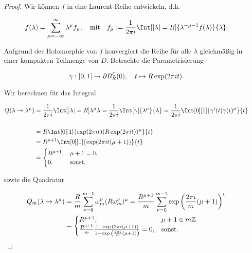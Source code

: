 \begin{proof}

    Wir können $f$ in eine Laurent-Reihe entwickeln, d.h.

    \begin{align*}
        f(\lambda) = \sum_{\mu = - \infty}^\infty \lambda^\mu f_\mu,
        \quad
        \text{mit}
        \quad
        f_\mu := \frac{1}{2\pi i} \Int[|\lambda| = R]{\lambda^{-\mu - 1} f(\lambda)}{\lambda}.
    \end{align*}

    Aufgrund der Holomorphie von $f$ konvergiert die Reihe für alle $\lambda$ gleichmäßig in einer kompakten Teilmenge von $D$.
    Betrachte die Parametrisierung

    \begin{align*}
        \gamma:
        [0,1] \to \partial B_R^{\mathbb{C}}(0), \quad
        t \mapsto R\exp(2\pi i t).
    \end{align*}

    Wir berechnen für das Integral

    \begin{align*}
        Q(\lambda \to \lambda^\mu)
        & =
        \frac{1}{2 \pi i}
        \Int[\abs{\lambda} = R]{\lambda^\mu}{\lambda}
         =
        \frac{1}{2 \pi i}
        \Int[\gamma]{\lambda^\mu}{\lambda}
         =
        \frac{1}{2 \pi i}
        \Int[0][1]{\gamma^\prime(t) \gamma(t)^\mu}{t} \\ \\
        & =
        R
        \Int[0][1]{\exp(2 \pi i t)(R \exp(2 \pi i t))^\mu}{t} \\
        & =
        R^{\mu + 1}
        \Int[0][1]{\exp(2\pi i t(\mu + 1))}{t} \\
        & =
        \begin{cases}
            R^{\mu + 1}, & \mu + 1 = 0, \\
            0,           & \text{sonst},
        \end{cases}
    \end{align*}

    sowie die Quadratur

    \begin{align*}
        Q_m(\lambda \to \lambda^\mu)
        &=
        \frac{R}{m}
        \sum_{\nu = 0}^{m - 1}
            \omega_m^\nu (R \omega_m^\nu)^\mu
        =
        \frac{R^{\mu + 1}}{m}
        \sum_{\nu = 0}^{m - 1}
            \exp {\left ( \frac{2\pi i}{m}(\mu + 1) \right )}^v \\
        &=
        \begin{cases}
            R^{\mu + 1},
            & \mu + 1 \in m \mathbb{Z} \\
            \frac{R^{\mu + 1}}{m}
            \frac
            {
                1 - \exp {\left ( 2 \pi i(\mu + 1) \right )}
            }{
                1 - \exp {\left ( \frac{2\pi i}{m}(\mu + 1) \right )}
            }
            =
            0,
            & \text{sonst}.
        \end{cases}
    \end{align*}


\end{proof}
